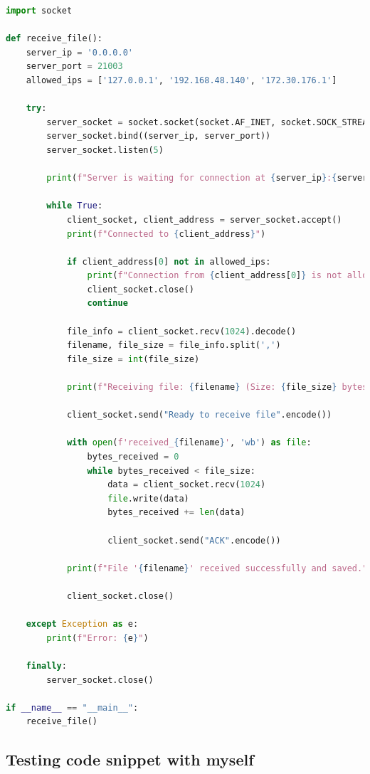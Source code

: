 \documentclass{article}
\begin{document}
\begin{lstlisting}[language=Python, caption=Server code for file transfer using TCP/IP]
import socket

def receive_file():
    server_ip = '0.0.0.0'  
    server_port = 21003
    allowed_ips = ['127.0.0.1', '192.168.48.140', '172.30.176.1'] 

    try:
        server_socket = socket.socket(socket.AF_INET, socket.SOCK_STREAM)
        server_socket.bind((server_ip, server_port))
        server_socket.listen(5) 

        print(f"Server is waiting for connection at {server_ip}:{server_port}...")

        while True: 
            client_socket, client_address = server_socket.accept()
            print(f"Connected to {client_address}")

            if client_address[0] not in allowed_ips:
                print(f"Connection from {client_address[0]} is not allowed.")
                client_socket.close()
                continue 

            file_info = client_socket.recv(1024).decode()
            filename, file_size = file_info.split(',')
            file_size = int(file_size)

            print(f"Receiving file: {filename} (Size: {file_size} bytes)")

            client_socket.send("Ready to receive file".encode())

            with open(f'received_{filename}', 'wb') as file:
                bytes_received = 0
                while bytes_received < file_size:
                    data = client_socket.recv(1024)
                    file.write(data)
                    bytes_received += len(data)

                    client_socket.send("ACK".encode())

            print(f"File '{filename}' received successfully and saved.")

            client_socket.close()

    except Exception as e:
        print(f"Error: {e}")

    finally:
        server_socket.close() 

if __name__ == "__main__":
    receive_file()

\end{lstlisting}

\subsection{Testing code snippet with myself}
\end{document}
